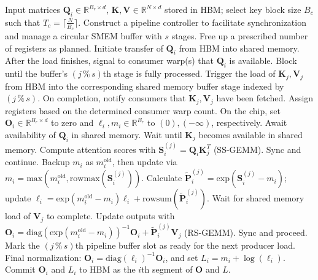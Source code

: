 \begin{algorithm}[H]
    \caption{\small\label{alg:flash3_wgmma_ws_only}\textsc{FlashAttention-3} forward pass \textbf{without} intra-consumer overlapping -- CTA view}
    \begin{algorithmic}[1]
\REQUIRE Input matrices $\mathbf{Q}_i \in \mathbb{R}^{B_r \times d}$, $\mathbf{K}, \mathbf{V} \in \mathbb{R}^{N \times d}$ stored in HBM; select key block size $B_c$ such that $T_c = \lceil \frac{N}{B_c} \rceil$.
\STATE Construct a pipeline controller to facilitate synchronization and manage a circular SMEM buffer with $s$ stages.
\STATE Free up a prescribed number of registers as planned.
\STATE Initiate transfer of $\mathbf{Q}_i$ from HBM into shared memory.
\STATE After the load finishes, signal to consumer warp(s) that $\mathbf{Q}_i$ is available.
    \STATE Block until the buffer's $(j\,\%\,s)$th stage is fully processed.
    \STATE Trigger the load of $\mathbf{K}_j, \mathbf{V}_j$ from HBM into the corresponding shared memory buffer stage indexed by $(j\,\%\,s)$.
    \STATE On completion, notify consumers that $\mathbf{K}_j, \mathbf{V}_j$ have been fetched.
\ENDFOR
\ELSE \STATE Assign registers based on the determined consumer warp count.
\STATE On the chip, set $\mathbf{O}_i \in \mathbb{R}^{B_r \times d}$ to zero and $\ell_i, m_i \in \mathbb{R}^{B_r}$ to $(0), (-\infty)$, respectively.
\STATE Await availability of $\mathbf{Q}_i$ in shared memory.
\STATE Wait until $\mathbf{K}_j$ becomes available in shared memory.
\STATE Compute attention scores with $\mathbf{S}_i^{(j)} = \mathbf{Q}_i \mathbf{K}_j^T$ (SS-GEMM). Sync and continue. \label{alg:ws_only_gemm1}
\STATE Backup $m_i$ as $m_i^{\mathrm{old}}$, then update via $m_i = \mathrm{max}(m_i^{\mathrm{old}}, \mathrm{rowmax}(\mathbf{S}_i^{(j)}))$. \label{code-ws:softmax_start}
\STATE Calculate $\widetilde{\mathbf{P}}_i^{(j)} = \mathrm{exp}(\mathbf{S}_i^{(j)} - m_i)$; update $\ell_i = \mathrm{exp}(m_i^{\mathrm{old}} - m_i) \ell_i + \mathrm{rowsum}(\widetilde{\mathbf{P}}_i^{(j)})$. \label{code-ws:softmax_end}
\STATE Wait for shared memory load of $\mathbf{V}_j$ to complete.
\STATE Update outputs with $\mathbf{O}_i = \mathrm{diag}(\mathrm{exp}(m_i^{\mathrm{old}} - m_i))^{-1} \mathbf{O}_i + \widetilde{\mathbf{P}}_i^{(j)} \mathbf{V}_j$ (RS-GEMM). Sync and proceed. \label{alg:ws_only_gemm2}
\STATE Mark the $(j\,\%\,s)$th pipeline buffer slot as ready for the next producer load.
\ENDFOR
\STATE Final normalization: $\mathbf{O}_i = \mathrm{diag}(\ell_i)^{-1} \mathbf{O}_i$, and set $L_i = m_i + \log(\ell_i)$.
\STATE Commit $\mathbf{O}_i$ and $L_i$ to HBM as the $i$th segment of $\mathbf{O}$ and $L$.
\ENDIF
\end{algorithmic}
\end{algorithm}

